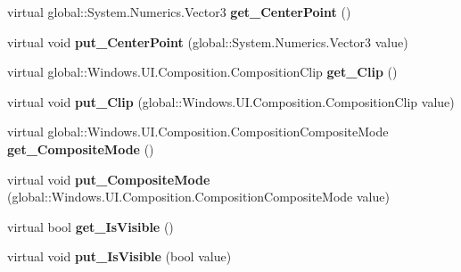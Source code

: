 \begin{DoxyCompactItemize}
virtual global\+::\+System.\+Numerics.\+Vector3 {\bfseries get\+\_\+\+Center\+Point} ()
\item 
\mbox{\label{class_windows_1_1_u_i_1_1_composition_1_1_visual_abaf21711735234faa45f4f4c7eee581d}} 
virtual void {\bfseries put\+\_\+\+Center\+Point} (global\+::\+System.\+Numerics.\+Vector3 value)
\item 
\mbox{\label{class_windows_1_1_u_i_1_1_composition_1_1_visual_ac3938fd79afc01b7c592141ee4b0cf63}} 
virtual global\+::\+Windows.\+U\+I.\+Composition.\+Composition\+Clip {\bfseries get\+\_\+\+Clip} ()
\item 
\mbox{\label{class_windows_1_1_u_i_1_1_composition_1_1_visual_a1d62ae483edf07661fa132e98c1d1dbf}} 
virtual void {\bfseries put\+\_\+\+Clip} (global\+::\+Windows.\+U\+I.\+Composition.\+Composition\+Clip value)
\item 
\mbox{\label{class_windows_1_1_u_i_1_1_composition_1_1_visual_a51075ac8d9a733304f167464da6c84b8}} 
virtual global\+::\+Windows.\+U\+I.\+Composition.\+Composition\+Composite\+Mode {\bfseries get\+\_\+\+Composite\+Mode} ()
\item 
\mbox{\label{class_windows_1_1_u_i_1_1_composition_1_1_visual_ad6c8a2e02e7ec62e2dd9406efe0e37b1}} 
virtual void {\bfseries put\+\_\+\+Composite\+Mode} (global\+::\+Windows.\+U\+I.\+Composition.\+Composition\+Composite\+Mode value)
\item 
\mbox{\label{class_windows_1_1_u_i_1_1_composition_1_1_visual_a3a7d203bd59ea8d7b4bc1978ab0fa1f9}} 
virtual bool {\bfseries get\+\_\+\+Is\+Visible} ()
\item 
\mbox{\label{class_windows_1_1_u_i_1_1_composition_1_1_visual_a81c567ec2b046085736b6354b159e7cd}} 
virtual void {\bfseries put\+\_\+\+Is\+Visible} (bool value)
\item 
\mbox{\label{class_windows_1_1_u_i_1_1_composition_1_1_visual_a905246c15eda186bee3efd6359a4ad4b}} 

\end{DoxyCompactItemize}
